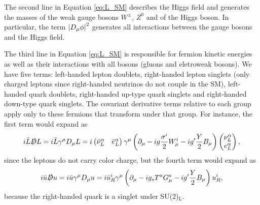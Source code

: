 The second line in Equation \eqref{eq:L_SM} describes the Higgs field and generates the masses of the weak gauge bosons $W^{\pm}$, $Z^{0}$ and of the Higgs boson. In particular, the term $\left\lvert D_{\mu}\phi\right\rvert^2$ generates all interactions between the gauge bosons and the Higgs field.

The third line in Equation \eqref{eq:L_SM} is responsible for fermion kinetic energies as well as their interactions with all bosons (gluons and eletroweak bosons). We have five terms: left-handed lepton doublets, right-handed lepton singlets (only charged leptons since right-handed neutrinos do not couple in the SM), left-handed quark doublets, right-handed up-type quark singlets and right-handed down-type quark singlets. The covariant derivative terms relative to each group apply only to these fermions that transform under that group. For instance, the first term would expand as
\begin{equation*}
    i\bar{L}\slashed{D} L = i\bar{L}\gamma^{\mu}D_\mu L = i
    \begin{pmatrix}
        \bar{\nu}_{L}^{\alpha} & \bar{e}_{L}^{\alpha}
    \end{pmatrix}
    \gamma^{\mu}\left(\partial_\mu - ig\frac{\sigma^{i}}{2}W_\mu^{i} - ig'\frac{Y}{2}B_\mu\right)
    \begin{pmatrix}
        \nu_{L}^{\alpha}\\
        e_{L}^{\alpha}
    \end{pmatrix},
\end{equation*}
since the leptons do not carry color charge, but the fourth term would expand as
\begin{equation*}
    i\bar{u}\slashed{D} u = i\bar{u}\gamma^{\mu}D_\mu u = i \bar{u}_{R}^{i}
    \gamma^{\mu}\left(\partial_\mu - ig_{s}T^{a}G_\mu^{a} - ig'\frac{Y}{2}B_\mu\right) u_{R}^{i},
\end{equation*}
because the right-handed quark is a singlet under SU(2)$_{\text{L}}$.


